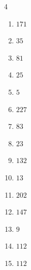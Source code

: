 \begin{multicols}{4}
\begin{enumerate}

  \item $171$


  \item $35$


  \item $81$


  \item $25$


\columnbreak %

  \item $5$


  \item $227$


  \item $83$


  \item $23$


  \item $132$


  \item $13$


  \item $202$


  \item $147$


  \item $9$


  \item $112$


  \item $112$



\end{enumerate}
\end{multicols}
